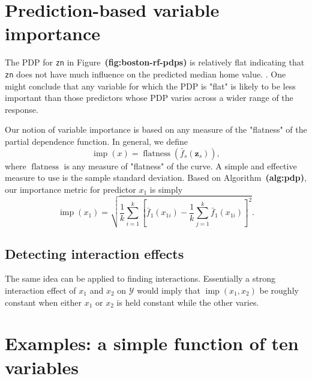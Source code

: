 \documentclass{article}
\def\code#1{\texttt{#1}}
\def\ref#1{\textbf{(#1)}}
\DeclareMathOperator{\flatness}{flatness}
\DeclareMathOperator{\imp}{imp}
\begin{document}
\section{Prediction-based variable importance}

The PDP for \code{zn} in Figure~\ref{fig:boston-rf-pdps} is relatively flat indicating that \code{zn} does not have much influence on the predicted median home value. . One might conclude that any variable for which the PDP is "flat" is likely to be less important than those predictors whose PDP varies across a wider range of the response.

Our notion of variable importance is based on any measure of the "flatness" of the partial dependence function. In general, we define
\begin{equation}
  \imp\left(x\right) = \flatness\left(\bar{f}_s\left(\boldsymbol{z}_s\right)\right),
\end{equation}
where $\flatness$ is any measure of "flatness" of the curve. A simple and effective measure to use is the sample standard deviation. Based on Algorithm~\ref{alg:pdp}, our importance metric for predictor $x_1$ is simply
\begin{equation}
  \imp\left(x_1\right) = \sqrt{\frac{1}{k}\sum_{i = 1}^k\left[\bar{f}_1\left(x_{1i}\right) - \frac{1}{k}\sum_{j = 1}^k\bar{f}_1\left(x_{1i}\right)\right] ^ 2}.
\end{equation}


\subsection{Detecting interaction effects}

The same idea can be applied to finding interactions. Essentially a strong interaction effect of $x_1$ and $x_2$ on $\mathcal{Y}$ would imply that $\imp\left(x_1, x_2\right)$ be roughly constant when either $x_1$ or $x_2$ is held constant while the other varies.




\section{Examples: a simple function of ten variables}
\end{document}
